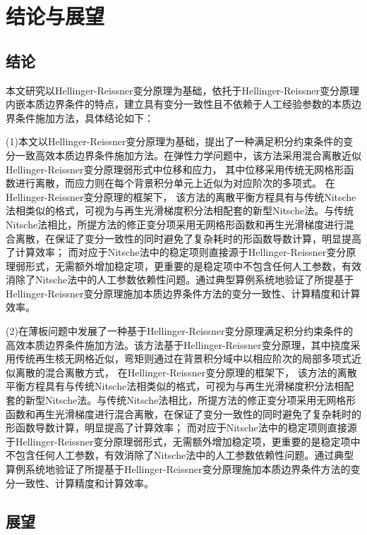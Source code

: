 \chapter{结论与展望}
\section{结论}
本文研究以Hellinger-Reissner变分原理为基础，依托于Hellinger-Reissner变分原理内嵌本质边界条件的特点，建立具有变分一致性且不依赖于人工经验参数的本质边界条件施加方法，具体结论如下：
\par
(1)本文以Hellinger-Reissner变分原理为基础，提出了一种满足积分约束条件的变分一致高效本质边界条件施加方法。在弹性力学问题中，该方法采用混合离散近似Hellinger-Reissner变分原理弱形式中位移和应力， 其中位移采用传统无网格形函数进行离散，而应力则在每个背景积分单元上近似为对应阶次的多项式。
在Hellinger-Reissner变分原理的框架下， 该方法的离散平衡方程具有与传统Nitsche法相类似的格式，可视为与再生光滑梯度积分法相配套的新型Nitsche法。与传统Nitsche法相比，所提方法的修正变分项采用无网格形函数和再生光滑梯度进行混合离散，在保证了变分一致性的同时避免了复杂耗时的形函数导数计算，明显提高了计算效率；
而对应于Nitsche法中的稳定项则直接源于Hellinger-Reissner变分原理弱形式，无需额外增加稳定项，更重要的是稳定项中不包含任何人工参数，有效消除了Nitsche法中的人工参数依赖性问题。通过典型算例系统地验证了所提基于Hellinger-Reissner变分原理施加本质边界条件方法的变分一致性、计算精度和计算效率。\par
(2)在薄板问题中发展了一种基于Hellinger-Reissner变分原理满足积分约束条件的高效本质边界条件施加方法。该方法基于Hellinger-Reissner变分原理，其中挠度采用传统再生核无网格近似，弯矩则通过在背景积分域中以相应阶次的局部多项式近似离散的混合离散方式，
在Hellinger-Reissner变分原理的框架下， 该方法的离散平衡方程具有与传统Nitsche法相类似的格式，可视为与再生光滑梯度积分法相配套的新型Nitsche法。与传统Nitsche法相比，所提方法的修正变分项采用无网格形函数和再生光滑梯度进行混合离散，在保证了变分一致性的同时避免了复杂耗时的形函数导数计算，明显提高了计算效率；
而对应于Nitsche法中的稳定项则直接源于Hellinger-Reissner变分原理弱形式，无需额外增加稳定项，更重要的是稳定项中不包含任何人工参数，有效消除了Nitsche法中的人工参数依赖性问题。通过典型算例系统地验证了所提基于Hellinger-Reissner变分原理施加本质边界条件方法的变分一致性、计算精度和计算效率。
\section{展望}
